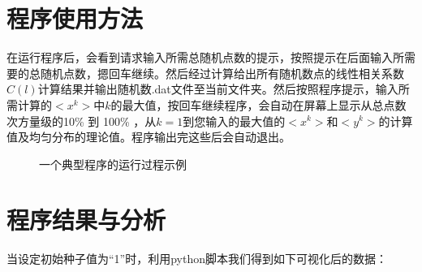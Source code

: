 \documentclass[a4paper,11pt]{article}
\begin{document}
\section{程序使用方法}
在运行程序后，会看到请求输入所需总随机点数的提示，按照提示在后面输入所需要的总随机点数，摁回车继续。然后经过计算给出所有随机数点的线性相关系数$C(l)$计算结果并输出随机数.dat文件至当前文件夹。然后按照程序提示，输入所需计算的$<x^{k}>$中$k$的最大值，按回车继续程序，会自动在屏幕上显示从总点数次方量级的10\% 到 100\% ，从$k=1$到您输入的最大值的$<x^{k}>$和$<y^{k}>$的计算值及均匀分布的理论值。程序输出完这些后会自动退出。
\begin{figure}[!htbp]        
\caption{\label{1} 一个典型程序的运行过程示例}      
\end{figure}


\section{程序结果与分析}
当设定初始种子值为“1”时，利用python脚本我们得到如下可视化后的数据：
\end{document}
